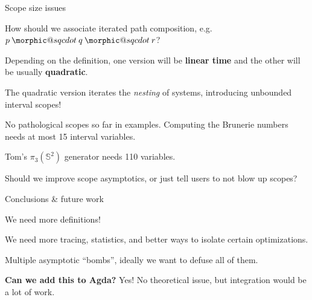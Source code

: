 \documentclass[dvipsnames]{beamer}
\makeatletter
\DeclareRobustCommand{\sqcdot}{\mathbin{\mathpalette\morphic@sqcdot\relax}}
\newcommand{\morphic@sqcdot}[2]{%
  \sbox\z@{$\m@th#1\centerdot$}%
  \ht\z@=.33333\ht\z@
  \vcenter{\box\z@}%
}
\makeatother
\begin{document}
\begin{frame}{Scope size issues}

How should we associate iterated path composition, e.g.\ $p \sqcdot q \sqcdot r$?
\vspace{1em}
\pause

Depending on the definition, one version will be \textbf{linear time}
and the other will be usually \textbf{quadratic}.
\vspace{1em}
\pause

The quadratic version iterates the \emph{nesting} of systems, introducing
unbounded interval scopes!
\vspace{1em}
\pause

No pathological scopes so far in examples. Computing the Brunerie
numbers needs at most 15 interval variables.
\vspace{1em}
\pause

Tom's $\pi_3(\mathbb{S}^2)$ generator needs 110 variables.
\vspace{1em}
\pause

Should we improve scope asymptotics, or just tell users to not blow up scopes?
\pause

\end{frame}


\begin{frame}{Conclusions \& future work}

We need more definitions!
\vspace{1em}
\pause

We need more tracing, statistics, and better ways to isolate certain optimizations.
\vspace{1em}
\pause

Multiple asymptotic ``bombs'', ideally we want to defuse all of them.
\vspace{1em}
\pause

\textbf{Can we add this to Agda?} Yes! No theoretical issue, but integration
would be a lot of work.

\end{frame}
\end{document}
